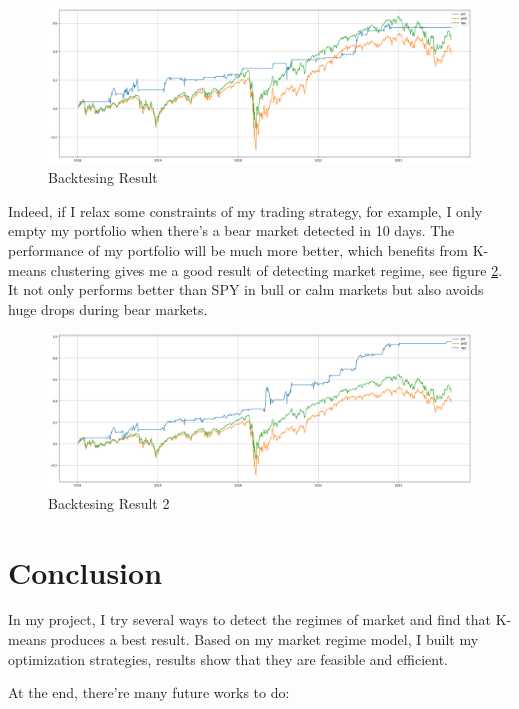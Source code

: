 \documentclass[a4paper,12pt]{article}
\begin{document}
\begin{figure}[H]
    \centering
    \includegraphics[scale=0.3]{backtest1.png}
    \caption{Backtesing Result}\label{backtest1}
\end{figure}

Indeed, if I relax some constraints of my trading strategy, for example, I only empty my portfolio when there's a bear market detected in 10 days. The performance of my portfolio will be much more better, which benefits from K-means clustering gives me a good result of detecting market regime, see figure \ref{backtest2}. It not only performs better than SPY in bull or calm markets but also avoids huge drops during bear markets.

\begin{figure}[H]
    \centering
    \includegraphics[scale=0.3]{backtest2.png}
    \caption{Backtesing Result 2}\label{backtest2}
\end{figure}

\section{Conclusion}

In my project, I try several ways to detect the regimes of market and find that K-means produces a best result. Based on my market regime model, I built my optimization strategies, results show that they are feasible and efficient.

At the end, there're many future works to do:
\end{document}
